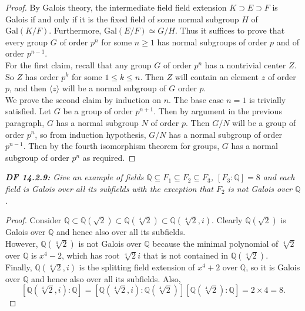 \documentclass{article}
\begin{document}
  \begin{proof}
    By Galois theory, the intermediate field field extension $K\supset
    E\supset F$ is Galois if and only if it is the fixed field of some
    normal subgroup $H$ of $\text{Gal}(K/F)$. Furthermore,
    $\text{Gal}(E/F)\simeq G/H$. Thus it suffices to prove that every group
    $G$ of order $p^n$ for some $n\geq1$ has normal subgroups of order $p$
    and of order $p^{n-1}$. \\

    For the first claim, recall that any group $G$ of order $p^n$ has a
    nontrivial center $Z$. So $Z$ has order $p^k$ for some $1\leq k\leq n$.
    Then $Z$ will contain an element $z$ of order $p$, and then $\langle
    z\rangle$ will be a normal subgroup of $G$ order $p$. \\

    We prove the second claim by induction on $n$. The base case $n=1$ is
    trivially satisfied. Let $G$ be a group of order $p^{n+1}$. Then by
    argument in the previous paragraph, $G$ has a normal subgroup $N$ of
    order $p$. Then $G/N$ will be a group of order $p^n$, so from induction
    hypothesis, $G/N$ has a normal subgroup of order $p^{n-1}$. Then by the
    fourth isomorphism theorem for groups, $G$ has a normal subgroup of
    order $p^n$ as required.
  \end{proof}

\it \textbf{DF 14.2.9:} Give an example of fields $\mathbb{Q}\subseteq
  F_1\subseteq F_2\subseteq F_3$, $[F_3:\mathbb{Q}]=8$ and each field is
  Galois over all its subfields with the exception that $F_2$ is not Galois
  over $\mathbb{Q}$.

  \begin{proof}
    Consider $\mathbb{Q} \subset\mathbb{Q}(\sqrt{2})
    \subset\mathbb{Q}(\sqrt[4]{2}) \subset\mathbb{Q}(\sqrt[4]{2},i)$.
    Clearly $\mathbb{Q}(\sqrt{2})$ is Galois over $\mathbb{Q}$ and hence
    also over all its subfields. \\

    However, $\mathbb{Q}(\sqrt[4]{2})$ is not Galois over $\mathbb{Q}$
    because the minimal polynomial of $\sqrt[4]{2}$ over $\mathbb{Q}$ is
    $x^4-2$, which has root $\sqrt[4]{2}i$ that is not contained in
    $\mathbb{Q}(\sqrt[4]{2})$. \\

    Finally, $\mathbb{Q}(\sqrt[4]{2},i)$ is the splitting field extension
    of $x^4+2$ over $\mathbb{Q}$, so it is Galois over $\mathbb{Q}$ and
    hence also over all its subfields. Also,
    \[[\mathbb{Q}(\sqrt[4]{2},i):\mathbb{Q}]
    =[\mathbb{Q}(\sqrt[4]{2},i):\mathbb{Q}(\sqrt[4]{2})]
    [\mathbb{Q}(\sqrt[4]{2}):\mathbb{Q}] =2\times4=8.\]
  \end{proof}
\end{document}
